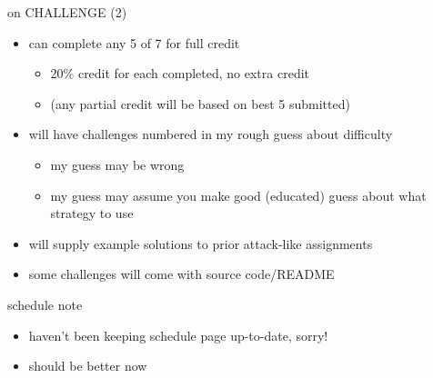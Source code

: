 \begin{frame}{on CHALLENGE (2)}
    \begin{itemize}
    \item can complete any 5 of 7 for full credit
        \begin{itemize}
        \item 20\% credit for each completed, no extra credit
        \item (any partial credit will be based on best 5 submitted)
        \end{itemize}
    \item will have challenges numbered in my rough guess about difficulty
        \begin{itemize}
        \item my guess may be wrong
        \item my guess may assume you make good (educated) guess about what strategy to use
        \end{itemize}
    \item will supply example solutions to prior attack-like assignments
    \item some challenges will come with source code/README
    \end{itemize}
\end{frame}

\begin{frame}{schedule note}
    \begin{itemize}
    \item haven't been keeping schedule page up-to-date, sorry!
    \item should be better now
    \end{itemize}
\end{frame}

